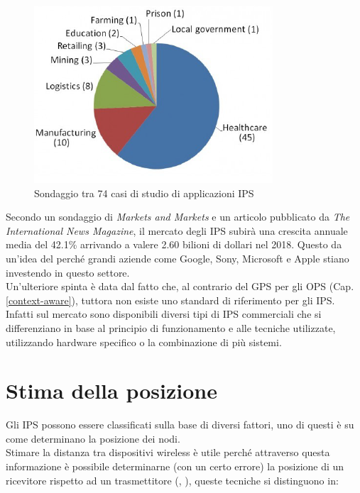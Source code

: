\begin{figure}[H]  
	\centering 
	\includegraphics[scale=1.2]{ContestoApplicativo/application.png}
	\caption{Sondaggio tra 74 casi di studio di applicazioni IPS \cite{market}}
	\label{fig:surveyApplication}
\end{figure}

Secondo un sondaggio  di \textit{Markets and Markets} e un articolo pubblicato da\textit{ The International News Magazine}, il mercato degli IPS subirà una crescita annuale media del 42.1\% arrivando a valere 2.60 bilioni di dollari nel 2018. Questo da un'idea del perché grandi aziende come Google, Sony, Microsoft e Apple stiano investendo in questo settore.\\
Un'ulteriore spinta è data dal fatto che, al contrario del GPS per gli OPS (Cap.\ref{context-aware}), tuttora non esiste uno standard di riferimento per gli IPS. Infatti sul mercato sono disponibili diversi tipi di IPS commerciali che si differenziano in base al principio di funzionamento e alle tecniche utilizzate, utilizzando hardware specifico o la combinazione di più sistemi.\\ 




\section{Stima della posizione}
\label{metodi_distanza}
Gli IPS possono essere classificati sulla base di diversi fattori, uno di questi è su come determinano la posizione dei nodi.\\
Stimare \cite{IPS2} la distanza tra dispositivi wireless è utile perché attraverso questa informazione è possibile determinarne (con un certo errore) la posizione di un ricevitore rispetto ad un trasmettitore (\cite{alg1}, \cite{alg2}), queste tecniche si distinguono in:

